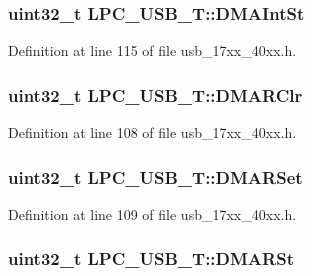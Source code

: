 \subsubsection[{\texorpdfstring{D\+M\+A\+Int\+St}{DMAIntSt}}]{ uint32\+\_\+t L\+P\+C\+\_\+\+U\+S\+B\+\_\+\+T\+::\+D\+M\+A\+Int\+St}\hypertarget{structLPC__USB__T_a23e42695592ef7fc7e4eb7bb222f0c8d}{}\label{structLPC__USB__T_a23e42695592ef7fc7e4eb7bb222f0c8d}


Definition at line 115 of file usb\+\_\+17xx\+\_\+40xx.\+h.

\subsubsection[{\texorpdfstring{D\+M\+A\+R\+Clr}{DMARClr}}]{ uint32\+\_\+t L\+P\+C\+\_\+\+U\+S\+B\+\_\+\+T\+::\+D\+M\+A\+R\+Clr}\hypertarget{structLPC__USB__T_ac5f8f7d89b1dd4d5bf47344394b1cc0b}{}\label{structLPC__USB__T_ac5f8f7d89b1dd4d5bf47344394b1cc0b}


Definition at line 108 of file usb\+\_\+17xx\+\_\+40xx.\+h.

\subsubsection[{\texorpdfstring{D\+M\+A\+R\+Set}{DMARSet}}]{ uint32\+\_\+t L\+P\+C\+\_\+\+U\+S\+B\+\_\+\+T\+::\+D\+M\+A\+R\+Set}\hypertarget{structLPC__USB__T_aba893942332bdf8113703dbc1586e8bf}{}\label{structLPC__USB__T_aba893942332bdf8113703dbc1586e8bf}


Definition at line 109 of file usb\+\_\+17xx\+\_\+40xx.\+h.

\subsubsection[{\texorpdfstring{D\+M\+A\+R\+St}{DMARSt}}]{ uint32\+\_\+t L\+P\+C\+\_\+\+U\+S\+B\+\_\+\+T\+::\+D\+M\+A\+R\+St}\hypertarget{structLPC__USB__T_acf65c3614e2f5393e2d508b34fbb5bce}{}\label{structLPC__USB__T_acf65c3614e2f5393e2d508b34fbb5bce}


